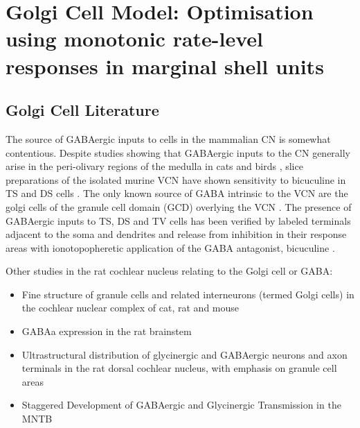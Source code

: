 

\graphicspath{{/media/data/Work/cnstellate/golgi/}{/media/data/Work/Responses/}{/media/data/Work/cnstellate/Responses/}{../figures/}{./gfx/}}

\section[Golgi Cell Model]{Golgi Cell Model: Optimisation using
  monotonic rate-level responses in marginal shell units}
\label{sec:golgi-cell-model}

\subsection{Golgi Cell Literature}

The source of GABAergic inputs to cells in the mammalian CN is
somewhat contentious. Despite studies showing that GABAergic inputs to
the CN generally arise in the peri-olivary regions of the medulla in
cats \citep{OstapoffBensonEtAl:1997} and birds
\citep{LachicaRubsamenEtAl:1995,YangMonsivaisEtAl:1999}, slice
preparations of the isolated murine VCN have shown sensitivity to
bicuculine in TS and DS cells \citep{FerragamoGoldingEtAl:1998a}.  The
only known source of GABA intrinsic to the VCN are the golgi cells of
the granule cell domain (GCD) overlying the VCN
\citep[Fig.~\ref{fig:CNdiagram}]{Mugnaini:1985,FerragamoGoldingEtAl:1998}.
The presence of GABAergic inputs to TS, DS and TV cells has been
verified by labeled terminals adjacent to the soma and dendrites
\citep{SmithRhode:1989,AwatramaniTurecekEtAl:2005,BabalianRyugoEtAl:2003}
and release from inhibition in their response areas with
ionotopopheretic application of the GABA antagonist, bicuculine
\citep{EvansZhao:1998,CasparyBackoffEtAl:1994,BackoffShadduckEtAl:1999,FerragamoGoldingEtAl:1998a}.

Other studies in the rat cochlear nucleus relating to the Golgi cell or GABA:
\begin{itemize}
\item \citep{MugnainiOsenEtAl:1980} Fine structure of granule cells
  and related interneurons (termed {Golgi} cells) in the cochlear
  nuclear complex of cat, rat and mouse
\item GABAa expression in the rat brainstem  \citep{CamposCaboEtAl:2001}
\item \citep{Alibardi:2003a} Ultrastructural distribution of
  glycinergic and {{GABAergic}} neurons and axon terminals in the rat
  dorsal cochlear nucleus, with emphasis on granule cell areas
\item \citep{AwatramaniTurecekEtAl:2005} Staggered {Development} of
  {GABAergic} and {Glycinergic} {Transmission} in the {MNTB}
\end{itemize}

